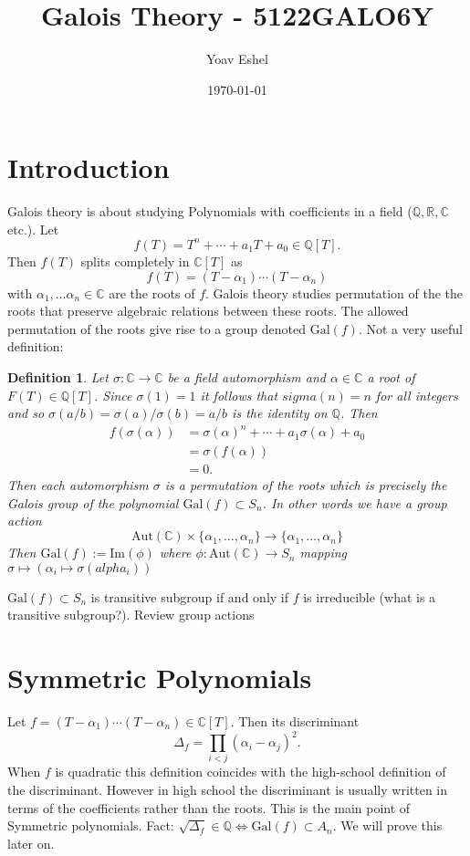 \documentclass{article}
\title{Galois Theory - 5122GALO6Y}
\author{Yoav Eshel}
\date{\today}
\newcommand{\R}{\mathbb{R}}
\newcommand{\C}{\mathbb{C}}
\newcommand{\Q}{\mathbb{Q}}
\newtheorem*{definition}{Definition}
\theoremstyle{remark}
\begin{document}
    \maketitle
    \tableofcontents
    \newpage
    \section{Introduction}
    Galois theory is about studying Polynomials with coefficients in a field ($\Q,\R,\C$ etc.).
    Let
    $$
        f(T) = T^n+\cdots+a_1T+a_0\in\Q[T].
    $$
    Then $f(T)$ splits completely in $\C[T]$ as
    $$
        f(T)=(T-\alpha_1)\cdots(T-\alpha_n)
    $$
    with $\alpha_1,\dots \alpha_n\in\C$ are the roots of $f$. Galois theory studies permutation of the the roots that preserve algebraic relations between these roots.
    The allowed permutation of the roots give rise to a group denoted $\text{Gal}(f)$.
    Not a very useful definition:

    \begin{definition}
        Let $\sigma:\C\to\C$ be a field automorphism and $\alpha\in\C$ a root of $F(T)\in\Q[T]$. Since $\sigma(1)=1$ it follows that $sigma(n)=n$ for all integers and so $\sigma(a/b)=\sigma(a)/\sigma(b)=a/b$ is the identity on $\Q$.
        Then
        \begin{align*}
            f(\sigma(\alpha))&=\sigma(\alpha)^n+\cdots+a_1\sigma(\alpha)+a_0\\
            &=\sigma(f(\alpha))\\
            &=0.
        \end{align*}
        Then each automorphism $\sigma$ is a permutation of the roots which is precisely the Galois group of the polynomial $\text{Gal}(f)\subset S_n$.
        In other words we have a group action 
        $$
        \text{Aut}(\C)\times\{\alpha_1,\dots,\alpha_n\}\to\{\alpha_1,\dots,\alpha_n\}
        $$
        Then $\text{Gal}(f):=\text{Im}(\phi)$ where $\phi:\text{Aut}(\C)\to S_n$ mapping $\sigma\mapsto(\alpha_i\mapsto \sigma(alpha_i))$
    \end{definition}

    $\text{Gal}(f)\subset S_n$ is transitive subgroup if and only if $f$ is irreducible (what is a transitive subgroup?).
    Review group actions
    \section{Symmetric Polynomials}
    Let $f=(T-\alpha_1)\cdots(T-\alpha_n)\in\C[T]$. Then its discriminant
    $$
        \Delta_f = \prod_{i<j}(\alpha_i-\alpha_j)^2.
    $$
    When $f$ is quadratic this definition coincides with the high-school definition of the discriminant. 
    However in high school the discriminant is usually written in terms of the coefficients rather than the roots. This is the main point of Symmetric polynomials.
    Fact: $\sqrt{\Delta_f}\in\Q\iff \text{Gal}(f)\subset A_n$. We will prove this later on.
\end{document}
